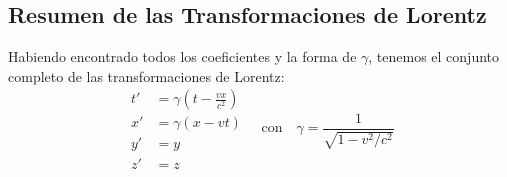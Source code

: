 \documentclass[11pt,a4paper]{article}
\begin{document}
\subsection*{Resumen de las Transformaciones de Lorentz}
Habiendo encontrado todos los coeficientes y la forma de $\gamma$, tenemos el conjunto completo de las transformaciones de Lorentz:
\[
\boxed{
\begin{aligned}
t' &= \gamma \left( t - \frac{vx}{c^2} \right) \\
x' &= \gamma (x - vt) \\
y' &= y \\
z' &= z
\end{aligned}
\quad \text{con} \quad
\gamma = \frac{1}{\sqrt{1 - v^2/c^2}}
}
\]

\end{document}
